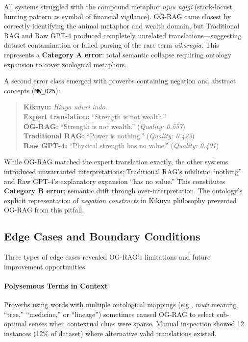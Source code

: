 All systems struggled with the compound metaphor \emph{njuu ngigi} (stork-locust hunting pattern as symbol of financial vigilance). OG-RAG came closest by correctly identifying the animal metaphor and wealth domain, but Traditional RAG and Raw GPT-4 produced completely unrelated translations—suggesting dataset contamination or failed parsing of the rare term \emph{aikaragia}. This represents a \textbf{Category A error}: total semantic collapse requiring ontology expansion to cover zoological metaphors.

A second error class emerged with proverbs containing negation and abstract concepts (\texttt{MW\_025}):

\begin{quote}
\textbf{Kikuyu:} \emph{Hinya nduri indo.}\\
\textbf{Expert translation:} ``Strength is not wealth.''\\
\textbf{OG-RAG:} ``Strength is not wealth.'' (\textit{Quality: 0.557})\\
\textbf{Traditional RAG:} ``Power is nothing.'' (\textit{Quality: 0.423})\\
\textbf{Raw GPT-4:} ``Physical strength has no value.'' (\textit{Quality: 0.401})
\end{quote}

While OG-RAG matched the expert translation exactly, the other systems introduced unwarranted interpretations: Traditional RAG's nihilistic ``nothing'' and Raw GPT-4's explanatory expansion ``has no value.'' This constitutes \textbf{Category B error}: semantic drift through over-interpretation. The ontology's explicit representation of \emph{negation constructs} in Kikuyu philosophy prevented OG-RAG from this pitfall.

\subsection{Edge Cases and Boundary Conditions}
\label{subsec:edge_cases}

Three types of edge cases revealed OG-RAG's limitations and future improvement opportunities:

\paragraph{Polysemous Terms in Context} Proverbs using words with multiple ontological mappings (e.g., \emph{muti} meaning ``tree,'' ``medicine,'' or ``lineage'') sometimes caused OG-RAG to select sub-optimal senses when contextual clues were sparse. Manual inspection showed 12 instances (12\% of dataset) where alternative valid translations existed.

